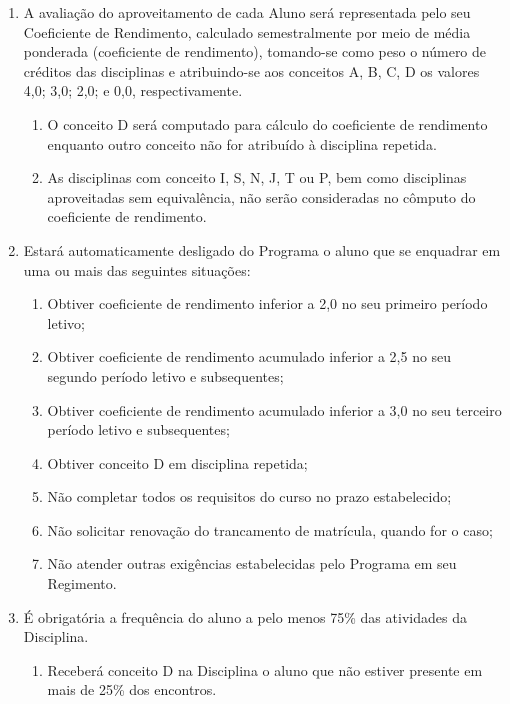 \documentclass{article}
\newcommand{\singleitem}{\item[Parágrafo Único.]}
\begin{document}
\begin{enumerate}
	\item A avaliação do aproveitamento de cada Aluno será representada pelo seu Coeficiente de Rendimento, calculado semestralmente por meio de média ponderada (coeficiente de rendimento), tomando-se como peso o número de créditos das disciplinas e atribuindo-se aos conceitos A, B, C, D os valores 4,0; 3,0; 2,0; e 0,0, respectivamente.

	\begin{enumerate}
		\item O conceito D será computado para cálculo do coeficiente de rendimento enquanto outro conceito não for atribuído à disciplina repetida.
		\item As disciplinas com conceito I, S, N, J, T ou P, bem como disciplinas aproveitadas sem equivalência, não serão consideradas no cômputo do coeficiente de rendimento.
	\end{enumerate}

	\item Estará automaticamente desligado do Programa o aluno que se enquadrar em uma ou mais das seguintes situações:
	\begin{enumerate}[label=\Roman*]
		\item Obtiver coeficiente de rendimento inferior a 2,0 no seu primeiro período letivo;
		\item Obtiver coeficiente de rendimento acumulado inferior a 2,5 no seu segundo período letivo e subsequentes;
		\item Obtiver coeficiente de rendimento acumulado inferior a 3,0 no seu terceiro período letivo e subsequentes;
		\item Obtiver conceito D em disciplina repetida;
		\item Não completar todos os requisitos do curso no prazo estabelecido;
		\item Não solicitar renovação do trancamento de matrícula, quando for o caso;
		\item Não atender outras exigências estabelecidas pelo Programa em seu Regimento.
	\end{enumerate}

	\item  É obrigatória a frequência do aluno a pelo menos 75\% das atividades da Disciplina.
	\begin{enumerate}
		\singleitem Receberá conceito D na Disciplina o aluno que não estiver presente em mais de 25\% dos encontros.
	\end{enumerate}


\end{enumerate}
\end{document}
